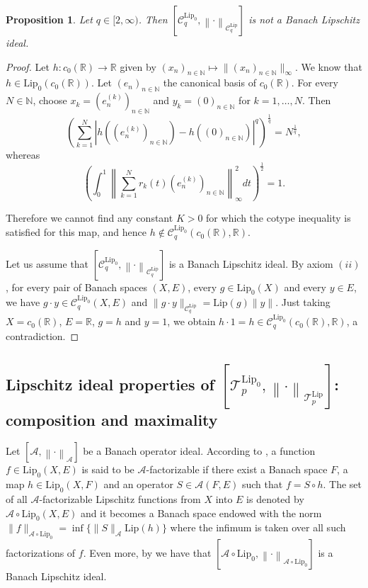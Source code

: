 \documentclass[12pt]{amsart}
\newtheorem{proposition}[theorem]{Proposition}
\def\A{\mathcal{A}}
\def\C{\mathcal{C}}
\def\R{\mathbb{R}}
\def\T{\mathcal{T}}
\def\C{\mathcal{C}}
\def\N{\mathbb{N}}
\def\Lip{\mathrm{Lip}_0}
\def\Lipnorm{\mathrm{Lip}}
\begin{document}
	\begin{proposition}
		Let $q \in [2,\infty)$. Then $[\C_q^{\Lip},\left\|\cdot\right\|_{\C_q^{\Lipnorm}}]$ is not a Banach Lipschitz ideal.
	\end{proposition}

	\begin{proof}
		Let $h:c_0(\R) \to \R$ given by $(x_n)_{n\in\N} \mapsto \|(x_n)_{n\in\N}\|_\infty$. We know that $h \in \Lip(c_0(\R))$. Let $(e_n)_{n\in\N}$ the canonical basis of $c_0(\R)$. For every $N\in\N$, choose $x_k = (e_n^{(k)})_{n\in\N}$ and $y_k = (0)_{n\in\N}$ for $k=1,\ldots, N$. Then
		$$
		\left( \sum_{k=1}^{N} \left|h((e_n^{(k)})_{n\in\N})-h((0)_{n\in\N})\right|^q \right)^{\frac{1}{q}} = N^{\frac{1}{q}},
		$$
		whereas
		$$
		\left( \int_0^1 \left\| \sum_{k=1}^{N} r_k(t)(e_n^{(k)})_{n\in\N} \right\|_\infty^2 dt \right)^{\frac{1}{2}} = 1.
		$$

		Therefore we cannot find any constant $K>0$ for which the cotype inequality is satisfied for this map, and hence $h \notin \C_q^{\Lip}(c_0(\R),\R)$.

		Let us assume that $[\C_q^{\Lip},\left\|\cdot\right\|_{\C_q^{\Lipnorm}}]$ is a Banach Lipschitz ideal. By axiom $(ii)$, for every pair of Banach spaces $(X,E)$, every $g \in \Lip(X)$ and every $y \in E$, we have $g\cdot y \in \C_q^{\Lip}(X,E)$ and $\|g\cdot y\|_{\C_q^{\Lipnorm}} = \Lipnorm(g)\|y\|$. Just taking $X=c_0(\R)$, $E=\R$, $g=h$ and $y=1$, we obtain $h\cdot 1 = h \in \C_q^{\Lip}(c_0(\R),\R)$, a contradiction.
	\end{proof}

\subsection{Lipschitz ideal properties of $[\T_p^{\Lip},\left\|\cdot\right\|_{\T_p^{\Lipnorm}}]$: composition and maximality}

Let $[\A,\left\|\cdot\right\|_\A]$ be a Banach operator ideal. According to \cite{Saa-17}, a function $f \in \Lip(X,E)$ is said to be $\A$-factorizable if there exist a Banach space $F$, a map $h \in \Lip(X,F)$ and an operator $S \in \A(F,E)$ such that $f = S \circ h$. The set of all $\A$-factorizable Lipschitz functions from $X$ into $E$ is denoted by $\A \circ \Lip(X,E)$ and it becomes a Banach space endowed with the norm $\|f\|_{\A\circ\Lip} = \inf\{\|S\|_\A \Lipnorm(h)\}$ where the infimum is taken over all such factorizations of $f$. Even more, by \cite[Theorem 2.1]{Saa-17} we have that $[\A\circ \Lip,\left\|\cdot\right\|_{\A\circ\Lip}]$ is a Banach Lipschitz ideal.
\end{document}
